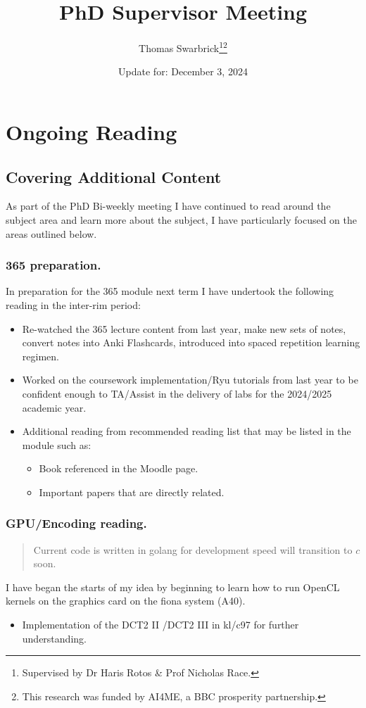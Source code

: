\documentclass[]{scrreprt}
\title{PhD Supervisor Meeting}
\author{Thomas Swarbrick\footnote{Supervised by Dr Haris Rotos \& Prof Nicholas Race.}\footnote{This research was funded by AI4ME, a BBC prosperity partnership.}}
\date{Update for: December 3, 2024}
\begin{document}
\maketitle

\chapter{Ongoing  Reading}
\section{Covering Additional Content}
As part of the PhD Bi-weekly meeting I have continued to read around the subject area and learn more about the subject, I have particularly focused on the areas outlined below.
\subsection{365 preparation.}

In preparation for the 365 module next term I have undertook the following reading in the inter-rim period:
\begin{itemize}
  \item Re-watched the 365 lecture content from last year, make new sets of notes, convert notes into Anki Flashcards, introduced into spaced repetition learning regimen.
  \item Worked on the coursework implementation/Ryu tutorials from last year to be confident enough to TA/Assist in the delivery of labs for the 2024/2025 academic year.
  \item Additional reading from recommended reading list that may be listed in the module such as:
        \begin{itemize}
          \item Book referenced in the Moodle page.
          \item Important papers that are directly related.
        \end{itemize}
\end{itemize}
\subsection{GPU/Encoding reading.}

\begin{quote}
  Current code is written in golang for development speed will transition to $c$ soon.
\end{quote}

I have began the starts of my idea by beginning to learn how to run OpenCL kernels on the graphics card on the fiona system (A40).
\begin{itemize}
  \item Implementation of the DCT2 II /DCT2 III in kl/c97 for further understanding.
\end{itemize}
\end{document}
